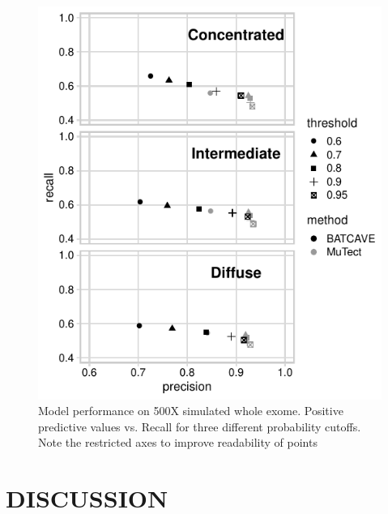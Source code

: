 \documentclass[a4,center,fleqn]{NAR}
\begin{document}
\begin{figure}
  \begin{center}
  \includegraphics{figures/ppv_wes.pdf}
  \end{center}
  \caption{Model performance on 500X simulated whole exome. 
  Positive predictive values vs. Recall for three different probability cutoffs. 
  Note the restricted axes to improve readability of points}
\label{NAR-ppv_fig}
\end{figure}



\section{DISCUSSION}
 
\end{document}
